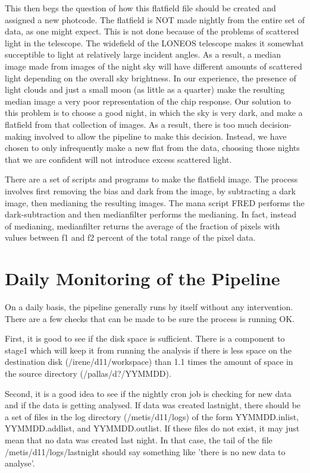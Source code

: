 \documentclass{article}
\begin{document}
This then begs the question of how this flatfield file should be
created and assigned a new photcode.  The flatfield is NOT made
nightly from the entire set of data, as one might expect.  This is not
done because of the problems of scattered light in the telescope.  The
widefield of the LONEOS telescope makes it somewhat succeptible to
light at relatively large incident angles.  As a result, a median
image made from images of the night sky will have different amounts of
scattered light depending on the overall sky brightness.  In our
experience, the presence of light clouds and just a small moon (as
little as a quarter) make the resulting median image a very poor
representation of the chip response.  Our solution to this problem is
to choose a good night, in which the sky is very dark, and make a
flatfield from that collection of images.  As a result, there is too
much decision-making involved to allow the pipeline to make this
decision.  Instead, we have chosen to only infrequently make a new
flat from the data, choosing those nights that we are confident will
not introduce excess scattered light.  

There are a set of scripts and programs to make the flatfield image.
The process involves first removing the bias and dark from the image,
by subtracting a dark image, then medianing the resulting images.
The mana script FRED performs the dark-subtraction and then
medianfilter performs the medianing.  In fact, instead of medianing,
medianfilter returns the average of the fraction of pixels with values
between f1 and f2 percent of the total range of the pixel data. 

\section{Daily Monitoring of the Pipeline}

On a daily basis, the pipeline generally runs by itself without any
intervention.  There are a few checks that can be made to be sure the
process is running OK.

First, it is good to see if the disk space is sufficient.  There is a
component to stage1 which will keep it from running the analysis if
there is less space on the destination disk (/irene/d11/workspace)
than 1.1 times the amount of space in the source directory
(/pallas/d?/YYMMDD).

Second, it is a good idea to see if the nightly cron job is checking
for new data and if the data is getting analysed.  If data was created
lastnight, there should be a set of files in the log directory
(/metis/d11/logs) of the form YYMMDD.inlist, YYMMDD.addlist, and
YYMMDD.outlist.  If these files do not exist, it may just mean that no
data was created last night.  In that case, the tail of the file
/metis/d11/logs/lastnight should say something like 'there is no new
data to analyse'.
\end{document}
